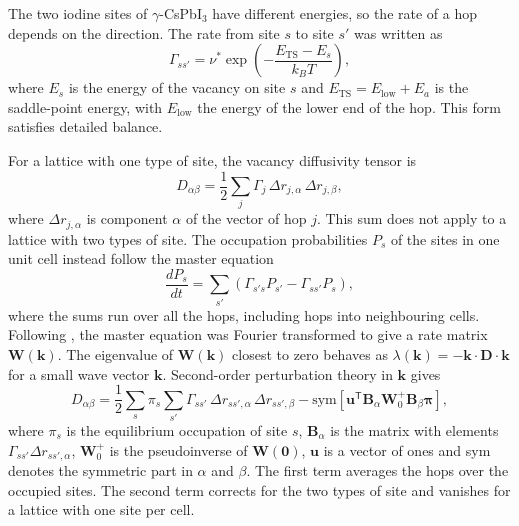 The two iodine sites of $\gamma$-CsPbI$_3$ have different energies, so the rate of a hop depends on the direction. The rate from site $s$ to site $s'$ was written as
\begin{equation*}
  \Gamma_{ss'} = \nu^{*} \exp\!\left(-\frac{E_\mathrm{TS} - E_s}{k_B T}\right) ,
\end{equation*}
where $E_s$ is the energy of the vacancy on site $s$ and $E_\mathrm{TS} = E_\mathrm{low} + E_a$ is the saddle-point energy, with $E_\mathrm{low}$ the energy of the lower end of the hop. This form satisfies detailed balance.

For a lattice with one type of site, the vacancy diffusivity tensor is
\begin{equation*}
  D_{\alpha\beta} = \frac{1}{2}\sum_j \Gamma_j\, \Delta r_{j,\alpha}\, \Delta r_{j,\beta} ,
\end{equation*}
where $\Delta r_{j,\alpha}$ is component $\alpha$ of the vector of hop $j$. This sum does not apply to a lattice with two types of site. The occupation probabilities $P_s$ of the sites in one unit cell instead follow the master equation
\begin{equation*}
  \frac{dP_s}{dt} = \sum_{s'} \left(\Gamma_{s's} P_{s'} - \Gamma_{ss'} P_s\right) ,
\end{equation*}
where the sums run over all the hops, including hops into neighbouring cells. Following \citet{Smolders2024}, the master equation was Fourier transformed to give a rate matrix $\mathbf{W}(\mathbf{k})$. The eigenvalue of $\mathbf{W}(\mathbf{k})$ closest to zero behaves as $\lambda(\mathbf{k}) = -\mathbf{k}\cdot\mathbf{D}\cdot\mathbf{k}$ for a small wave vector $\mathbf{k}$. Second-order perturbation theory in $\mathbf{k}$ gives
\begin{equation}
  D_{\alpha\beta} = \frac{1}{2}\sum_{s}\pi_s \sum_{s'} \Gamma_{ss'}\, \Delta r_{ss',\alpha}\, \Delta r_{ss',\beta}
  - \mathrm{sym}\!\left[\mathbf{u}^{\mathsf{T}} \mathbf{B}_\alpha \mathbf{W}_0^{+} \mathbf{B}_\beta \boldsymbol{\pi}\right] ,
  \label{eq:diffusivity}
\end{equation}
where $\pi_s$ is the equilibrium occupation of site $s$, $\mathbf{B}_\alpha$ is the matrix with elements $\Gamma_{ss'}\Delta r_{ss',\alpha}$, $\mathbf{W}_0^{+}$ is the pseudoinverse of $\mathbf{W}(\mathbf{0})$, $\mathbf{u}$ is a vector of ones and sym denotes the symmetric part in $\alpha$ and $\beta$. The first term averages the hops over the occupied sites. The second term corrects for the two types of site and vanishes for a lattice with one site per cell.

